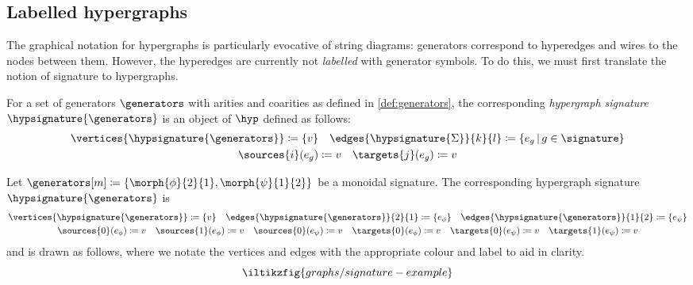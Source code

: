 \subsection{Labelled hypergraphs}

The graphical notation for hypergraphs is particularly evocative of string
diagrams: generators
correspond to hyperedges and wires to the nodes between them.
However, the hyperedges are currently not \emph{labelled} with generator
symbols.
To do this, we must first translate the notion of signature to hypergraphs.

\begin{definition}
    For a set of generators \(\generators\) with arities and coarities as defined
    in \cref{def:generators}, the corresponding \emph{hypergraph signature}
    \(\hypsignature{\generators}\) is an object of \(\hyp\) defined as follows:
    \begin{gather*}
        \vertices{\hypsignature{\generators}}
        \coloneqq
        \{ v \}
        \quad
        \edges{\hypsignature{\Sigma}}{k}{l}
        \coloneqq
        \{ e_g \,|\, g \in \signature\}
        \\
        \sources{i}(e_g) \coloneqq v
        \quad
        \targets{j}(e_g) \coloneqq v
    \end{gather*}
\end{definition}

\begin{example}\label{ex:labelled-hypergraph-signature}
    Let \(\generators[m] \coloneqq \{\morph{\phi}{2}{1}, \morph{\psi}{1}{2}\}\)
    be a monoidal signature.
    The corresponding hypergraph signature \(\hypsignature{\generators}\) is
    \begin{gather*}
        \vertices{\hypsignature{\generators}} \coloneqq \{v\}
        \quad
        \edges{\hypsignature{\generators}}{2}{1} \coloneqq \{e_\phi\}
        \quad
        \edges{\hypsignature{\generators}}{1}{2} \coloneqq \{e_\psi\}
        \\
        \sources{0}(e_\phi) \coloneqq v
        \quad
        \sources{1}(e_\phi) \coloneqq v
        \quad
        \sources{0}(e_\psi) \coloneqq v
        \quad
        \targets{0}(e_\phi) \coloneqq v
        \quad
        \targets{0}(e_\psi) \coloneqq v
        \quad
        \targets{1}(e_\psi) \coloneqq v
    \end{gather*}
    and is drawn as follows, where we notate the vertices and edges with the
    appropriate colour and label to aid in clarity.
    \[
        \iltikzfig{graphs/signature-example}
    \]
\end{example}


